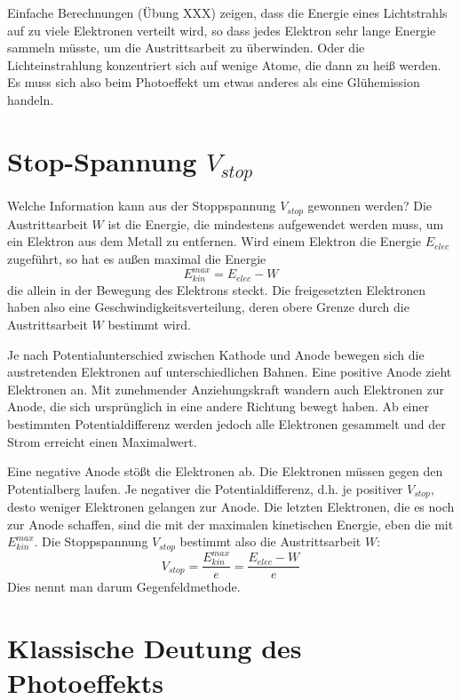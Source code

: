 Einfache Berechnungen (Übung XXX) zeigen, dass die Energie eines Lichtstrahls auf zu viele Elektronen verteilt wird, so dass jedes Elektron sehr lange Energie sammeln müsste, um die Austrittsarbeit zu überwinden. Oder die Lichteinstrahlung konzentriert sich auf wenige Atome, die dann zu heiß werden. Es muss sich also beim Photoeffekt um etwas anderes als eine Glühemission handeln.

\section{Stop-Spannung  $V_{stop}$ }

Welche Information kann aus der Stoppspannung $V_{stop}$ gewonnen werden? Die Austrittsarbeit $W$ ist die Energie, die mindestens aufgewendet werden muss, um ein Elektron aus dem Metall zu entfernen. Wird einem Elektron die Energie $E_{elec}$ zugeführt, so hat es außen maximal die Energie 
\begin{equation}
    E_{kin}^{max} = E_{elec} - W
\end{equation}
die allein in der Bewegung des Elektrons steckt. Die freigesetzten Elektronen haben also eine Geschwindigkeitsverteilung, deren obere Grenze durch die Austrittsarbeit $W$ bestimmt wird.

Je nach Potentialunterschied zwischen Kathode und Anode bewegen sich die austretenden Elektronen auf unterschiedlichen Bahnen. Eine positive Anode zieht Elektronen an. Mit zunehmender Anziehungskraft wandern auch Elektronen zur Anode, die sich ursprünglich in eine andere Richtung bewegt haben. Ab einer bestimmten Potentialdifferenz werden jedoch alle Elektronen gesammelt und der Strom erreicht einen Maximalwert.

Eine negative Anode stößt die Elektronen ab. Die Elektronen müssen gegen den Potentialberg laufen. Je negativer die Potentialdifferenz, d.h. je positiver $V_{stop}$, desto weniger Elektronen gelangen zur Anode. Die letzten Elektronen, die es noch zur Anode schaffen, sind die mit der maximalen kinetischen Energie, eben die mit $ E_{kin}^{max}$. Die Stoppspannung $V_{stop}$ bestimmt also die Austrittsarbeit $W$:
\begin{equation}
    V_{stop} = \frac{E_{kin}^{max}}{e} = \frac{E_{elec} - W}{e}  
\end{equation}
Dies nennt man darum Gegenfeldmethode.


\section{Klassische Deutung des Photoeffekts}

